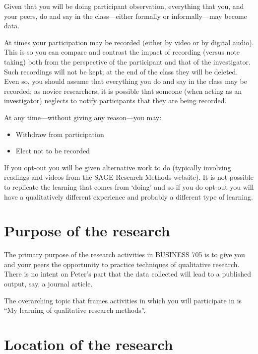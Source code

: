 \documentclass[]{book}
\providecommand{\tightlist}{%
  \setlength{\itemsep}{0pt}\setlength{\parskip}{0pt}}
\theoremstyle{definition}
\theoremstyle{definition}
\theoremstyle{definition}
\theoremstyle{remark}
\begin{document}
Given that you will be doing participant observation, everything that
you, and your peers, do and say in the class---either formally or
informally---may become data.

At times your participation may be recorded (either by video or by
digital audio). This is so you can compare and contrast the impact of
recording (versus note taking) both from the perspective of the
participant and that of the investigator. Such recordings will not be
kept; at the end of the class they will be deleted. Even so, you should
assume that everything you do and say in the class may be recorded; as
novice researchers, it is possible that someone (when acting as an
investigator) neglects to notify participants that they are being
recorded.

At any time---without giving any reason---you may:

\begin{itemize}
\tightlist
\item
  Withdraw from participation
\item
  Elect not to be recorded
\end{itemize}

If you opt-out you will be given alternative work to do (typically
involving readings and videos from the SAGE Research Methods website).
It is not possible to replicate the learning that comes from `doing' and
so if you do opt-out you will have a qualitatively different experience
and probably a different type of learning.

\hypertarget{purpose-of-the-research}{%
\section{Purpose of the research}\label{purpose-of-the-research}}

The primary purpose of the research activities in BUSINESS 705 is to
give you and your peers the opportunity to practice techniques of
qualitative research. There is no intent on Peter's part that the data
collected will lead to a published output, say, a journal article.

The overarching topic that frames activities in which you will
participate in is ``My learning of qualitative research methods''.

\hypertarget{location-of-the-research}{%
\section{Location of the research}\label{location-of-the-research}}
\end{document}
